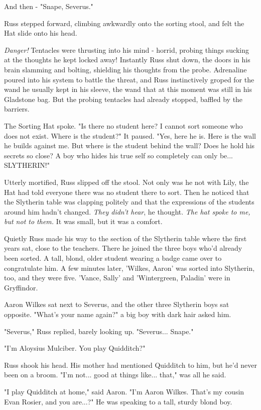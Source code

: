 \documentclass[a4paper,11pt]{article}
\begin{document}
And then - "Snape, Severus."

Russ stepped forward, climbing awkwardly onto the sorting stool, and felt the Hat slide onto his head.

\emph{Danger!} Tentacles were thrusting into his mind - horrid, probing things sucking at the thoughts he kept locked away! Instantly Russ shut down, the doors in his brain slamming and bolting, shielding his thoughts from the probe. Adrenaline poured into his system to battle the threat, and Russ instinctively groped for the wand he usually kept in his sleeve, the wand that at this moment was still in his Gladstone bag. But the probing tentacles had already stopped, baffled by the barriers.

The Sorting Hat spoke. "Is there no student here? I cannot sort someone who does not exist. Where is the student?" It paused. "Yes, here he is. Here is the wall he builds against me. But where is the student behind the wall? Does he hold his secrets so close? A boy who hides his true self so completely can only be... SLYTHERIN!"

Utterly mortified, Russ slipped off the stool. Not only was he not with Lily, the Hat had told everyone there was no student there to sort. Then he noticed that the Slytherin table was clapping politely and that the expressions of the students around him hadn't changed. \emph{They didn't hear}, he thought. \emph{The hat spoke to me, but not to them.} It was small, but it was a comfort.

Quietly Russ made his way to the section of the Slytherin table where the first years sat, close to the teachers. There he joined the three boys who'd already been sorted. A tall, blond, older student wearing a badge came over to congratulate him. A few minutes later, 'Wilkes, Aaron' was sorted into Slytherin, too, and they were five. 'Vance, Sally' and 'Wintergreen, Paladin' were in Gryffindor.

Aaron Wilkes sat next to Severus, and the other three Slytherin boys sat opposite. "What's your name again?" a big boy with dark hair asked him.

"Severus," Russ replied, barely looking up. "Severus... Snape."

"I'm Aloysius Mulciber. You play Quidditch?"

Russ shook his head. His mother had mentioned Quidditch to him, but he'd never been on a broom. "I'm not... good at things like... that," was all he said.

"I play Quidditch at home," said Aaron. "I'm Aaron Wilkes. That's my cousin Evan Rosier, and you are...?" He was speaking to a tall, sturdy blond boy.
\end{document}
